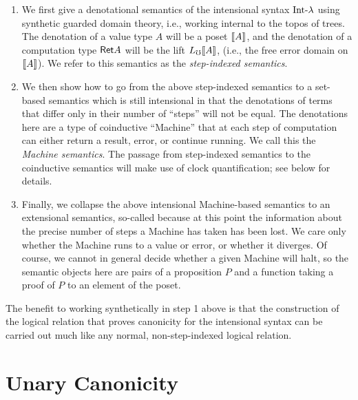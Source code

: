 \documentclass{article}
\begin{document}
\begin{enumerate}
    \item We first give a denotational semantics of the intensional syntax $\text{Int-}\lambda$
    using synthetic guarded domain theory, i.e., working internal to the topos of trees.
    The denotation of a value type $A$ will be a poset $\llbracket {A} \rrbracket$, and the denotation of a computation
    type $\mathsf{Ret} A$ will be the lift $L_\mho \llbracket {A} \rrbracket$, (i.e., the free error domain on $\llbracket {A} \rrbracket$). %
    We refer to this semantics as the \emph{step-indexed semantics}.


    \item We then show how to go from the above step-indexed semantics to a set-based
    semantics which is still intensional in that the denotations of terms that differ only in
    their number of ``steps'' will not be equal. The denotations here are a type of
    coinductive ``Machine'' that at each step of computation can either return a result,
    error, or continue running. We call this the \emph{Machine semantics}.
    The passage from step-indexed semantics to the coinductive semantics
    will make use of clock quantification; see below for details.

    \item Finally, we collapse the above intensional Machine-based semantics to an
    extensional semantics, so-called because at this point the information about the
    precise number of steps a Machine has taken has been lost. We care only whether the
    Machine runs to a value or error, or whether it diverges. Of course, we cannot
    in general decide whether a given Machine will halt, so the semantic objects here
    are pairs of a proposition $P$ and a function taking a proof of $P$ to an element of
    the poset.

\end{enumerate}
    
The benefit to working synthetically in step 1 above is that the construction of the logical
relation that proves canonicity for the intensional syntax can be carried out much like
any normal, non-step-indexed logical relation.


\section{Unary Canonicity}
\end{document}
